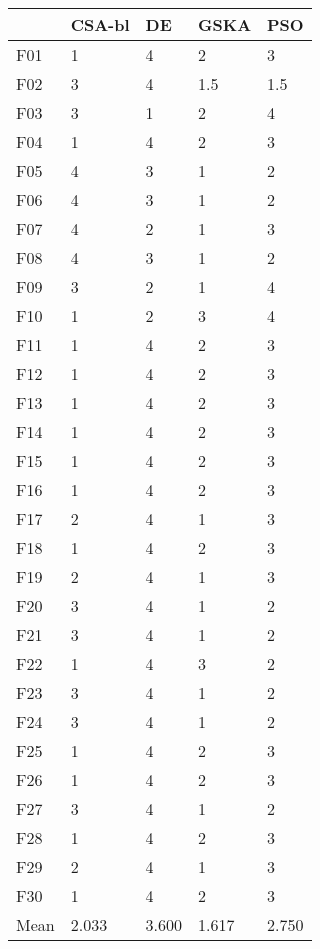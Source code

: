 \begin{tabular}{lllll}
\toprule
{} & CSA-bl &     DE &   GSKA &    PSO \\
\midrule
F01  &      1 &      4 &      2 &      3 \\
F02  &      3 &      4 &    1.5 &    1.5 \\
F03  &      3 &      1 &      2 &      4 \\
F04  &      1 &      4 &      2 &      3 \\
F05  &      4 &      3 &      1 &      2 \\
F06  &      4 &      3 &      1 &      2 \\
F07  &      4 &      2 &      1 &      3 \\
F08  &      4 &      3 &      1 &      2 \\
F09  &      3 &      2 &      1 &      4 \\
F10  &      1 &      2 &      3 &      4 \\
F11  &      1 &      4 &      2 &      3 \\
F12  &      1 &      4 &      2 &      3 \\
F13  &      1 &      4 &      2 &      3 \\
F14  &      1 &      4 &      2 &      3 \\
F15  &      1 &      4 &      2 &      3 \\
F16  &      1 &      4 &      2 &      3 \\
F17  &      2 &      4 &      1 &      3 \\
F18  &      1 &      4 &      2 &      3 \\
F19  &      2 &      4 &      1 &      3 \\
F20  &      3 &      4 &      1 &      2 \\
F21  &      3 &      4 &      1 &      2 \\
F22  &      1 &      4 &      3 &      2 \\
F23  &      3 &      4 &      1 &      2 \\
F24  &      3 &      4 &      1 &      2 \\
F25  &      1 &      4 &      2 &      3 \\
F26  &      1 &      4 &      2 &      3 \\
F27  &      3 &      4 &      1 &      2 \\
F28  &      1 &      4 &      2 &      3 \\
F29  &      2 &      4 &      1 &      3 \\
F30  &      1 &      4 &      2 &      3 \\
Mean &  2.033 &  3.600 &  1.617 &  2.750 \\
\bottomrule
\end{tabular}
